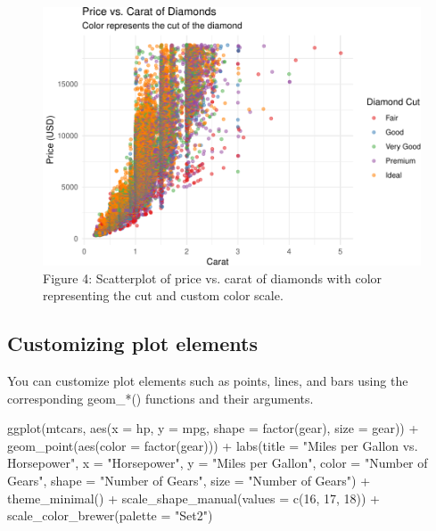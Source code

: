 \documentclass[
]{book}
\newenvironment{Shaded}{\begin{snugshade}}{\end{snugshade}}
\newcommand{\AttributeTok}[1]{\textcolor[rgb]{0.77,0.63,0.00}{#1}}
\newcommand{\DecValTok}[1]{\textcolor[rgb]{0.00,0.00,0.81}{#1}}
\newcommand{\FunctionTok}[1]{\textcolor[rgb]{0.00,0.00,0.00}{#1}}
\newcommand{\NormalTok}[1]{#1}
\newcommand{\SpecialCharTok}[1]{\textcolor[rgb]{0.00,0.00,0.00}{#1}}
\newcommand{\StringTok}[1]{\textcolor[rgb]{0.31,0.60,0.02}{#1}}
\begin{document}
\begin{figure}
\includegraphics[width=1\linewidth]{graphformatting_files/figure-latex/fig4-1} \caption{Figure 4: Scatterplot of price vs. carat of diamonds with color representing the cut and custom color scale.}\label{fig:fig4}
\end{figure}

\hypertarget{customizing-plot-elements}{%
\subsection{Customizing plot elements}\label{customizing-plot-elements}}

You can customize plot elements such as points, lines, and bars using the corresponding geom\_*() functions and their arguments.

\begin{Shaded}
\begin{Highlighting}[]
\FunctionTok{ggplot}\NormalTok{(mtcars, }\FunctionTok{aes}\NormalTok{(}\AttributeTok{x =}\NormalTok{ hp, }\AttributeTok{y =}\NormalTok{ mpg, }\AttributeTok{shape =} \FunctionTok{factor}\NormalTok{(gear), }\AttributeTok{size =}\NormalTok{ gear)) }\SpecialCharTok{+}
  \FunctionTok{geom\_point}\NormalTok{(}\FunctionTok{aes}\NormalTok{(}\AttributeTok{color =} \FunctionTok{factor}\NormalTok{(gear))) }\SpecialCharTok{+}
  \FunctionTok{labs}\NormalTok{(}\AttributeTok{title =} \StringTok{"Miles per Gallon vs. Horsepower"}\NormalTok{,}
       \AttributeTok{x =} \StringTok{"Horsepower"}\NormalTok{,}
       \AttributeTok{y =} \StringTok{"Miles per Gallon"}\NormalTok{,}
       \AttributeTok{color =} \StringTok{"Number of Gears"}\NormalTok{,}
       \AttributeTok{shape =} \StringTok{"Number of Gears"}\NormalTok{,}
       \AttributeTok{size =} \StringTok{"Number of Gears"}\NormalTok{) }\SpecialCharTok{+}
  \FunctionTok{theme\_minimal}\NormalTok{() }\SpecialCharTok{+}
  \FunctionTok{scale\_shape\_manual}\NormalTok{(}\AttributeTok{values =} \FunctionTok{c}\NormalTok{(}\DecValTok{16}\NormalTok{, }\DecValTok{17}\NormalTok{, }\DecValTok{18}\NormalTok{)) }\SpecialCharTok{+}
  \FunctionTok{scale\_color\_brewer}\NormalTok{(}\AttributeTok{palette =} \StringTok{"Set2"}\NormalTok{)}
\end{Highlighting}
\end{Shaded}
\end{document}
